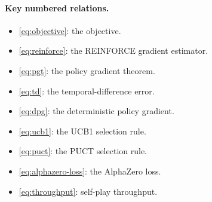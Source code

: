 \paragraph{Key numbered relations.}

\begin{itemize}
  \item \eqref{eq:objective}: the objective.
  \item \eqref{eq:reinforce}: the REINFORCE gradient estimator.
  \item \eqref{eq:pgt}: the policy gradient theorem.
  \item \eqref{eq:td}: the temporal-difference error.
  \item \eqref{eq:dpg}: the deterministic policy gradient.
  \item \eqref{eq:ucb1}: the UCB1 selection rule.
  \item \eqref{eq:puct}: the PUCT selection rule.
  \item \eqref{eq:alphazero-loss}: the AlphaZero loss.
  \item \eqref{eq:throughput}: self-play throughput.
\end{itemize}
